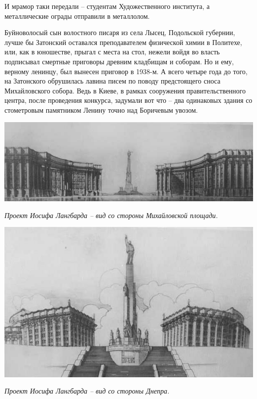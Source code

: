 И мрамор таки передали – студентам Художественного института, а металлические ограды отправили в металлолом.

Буйноволосый сын волостного писаря из села Лысец, Подольской губернии, лучше бы Затонский оставался преподавателем физической химии в Политехе, или, как в юношестве, прыгал с места на стол, нежели войдя во власть подписывал смертные приговоры древним кладбищам и соборам. Но и ему, верному ленинцу, был вынесен приговор в 1938-м. А всего четыре года до того, на Затонского обрушилась лавина писем по поводу предстоящего сноса Михайловского собора. Ведь в Киеве, в рамках сооружения правительственного центра, после проведения конкурса, задумали вот что – два одинаковых здания со стометровым памятником Ленину точно над Боричевым увозом.





\begin{center}
\includegraphics[width=\linewidth]{chast-volga/oskoldidir/langbard1.jpg}

\textit{Проект Иосифа Лангбарда – вид со стороны Михайловской площади.}
\end{center}

\begin{center}
\includegraphics[width=\linewidth]{chast-volga/oskoldidir/langbard2.jpg}

\textit{Проект Иосифа Лангбарда – вид со стороны Днепра.}
\end{center}

